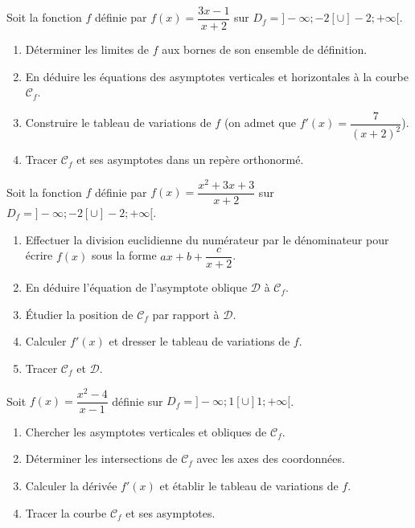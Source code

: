 \documentclass[11pt]{article}
\begin{document}
\begin{exercice}
Soit la fonction $f$ définie par $f(x)=\dfrac{3x-1}{x+2}$ sur $D_f=]-\infty;-2[\cup]-2;+\infty[$.
\begin{enumerate}
\item Déterminer les limites de $f$ aux bornes de son ensemble de définition.
\item En déduire les équations des asymptotes verticales et horizontales à la courbe $\mathcal{C}_f$.
\item Construire le tableau de variations de $f$ (on admet que $f'(x)=\dfrac{7}{(x+2)^2}$).
\item Tracer $\mathcal{C}_f$ et ses asymptotes dans un repère orthonormé.
\end{enumerate}
\end{exercice}

\begin{exercice}
Soit la fonction $f$ définie par $f(x)=\dfrac{x^2+3x+3}{x+2}$ sur $D_f=]-\infty;-2[\cup]-2;+\infty[$.
\begin{enumerate}
\item Effectuer la division euclidienne du numérateur par le dénominateur pour écrire $f(x)$ sous la forme $ax+b+\dfrac{c}{x+2}$.
\item En déduire l'équation de l'asymptote oblique $\mathcal{D}$ à $\mathcal{C}_f$.
\item Étudier la position de $\mathcal{C}_f$ par rapport à $\mathcal{D}$.
\item Calculer $f'(x)$ et dresser le tableau de variations de $f$.
\item Tracer $\mathcal{C}_f$ et $\mathcal{D}$.
\end{enumerate}
\end{exercice}

\begin{exercice}
Soit $f(x)=\dfrac{x^2-4}{x-1}$ définie sur $D_f=]-\infty;1[\cup]1;+\infty[$.
\begin{enumerate}
\item Chercher les asymptotes verticales et obliques de $\mathcal{C}_f$.
\item Déterminer les intersections de $\mathcal{C}_f$ avec les axes des coordonnées.
\item Calculer la dérivée $f'(x)$ et établir le tableau de variations de $f$.
\item Tracer la courbe $\mathcal{C}_f$ et ses asymptotes.
\end{enumerate}
\end{exercice}
\end{document}
